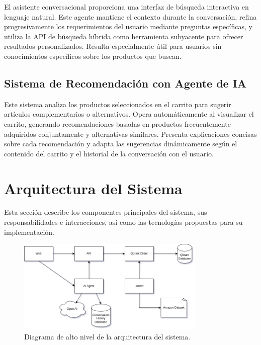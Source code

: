 \documentclass[12pt]{article}
\begin{document}
El asistente conversacional proporciona una interfaz de búsqueda interactiva en lenguaje natural. Este agente mantiene el contexto durante la conversación, refina progresivamente los requerimientos del usuario mediante preguntas específicas, y utiliza la API de búsqueda híbrida como herramienta subyacente para ofrecer resultados personalizados. Resulta especialmente útil para usuarios sin conocimientos específicos sobre los productos que buscan.

\subsection{Sistema de Recomendación con Agente de IA}

Este sistema analiza los productos seleccionados en el carrito para sugerir artículos complementarios o alternativos. Opera automáticamente al visualizar el carrito, generando recomendaciones basadas en productos frecuentemente adquiridos conjuntamente y alternativas similares. Presenta explicaciones concisas sobre cada recomendación y adapta las sugerencias dinámicamente según el contenido del carrito y el historial de la conversación con el usuario.

\newpage

\section{Arquitectura del Sistema}

Esta sección describe los componentes principales del sistema, sus responsabilidades e interacciones, así como las tecnologías propuestas para su implementación.

\vspace{1cm}

\begin{figure}[H]
    \centering
    \includegraphics[width=0.8\textwidth]{architecture.png}
    \caption{Diagrama de alto nivel de la arquitectura del sistema.}
    \label{fig:system_architecture}
\end{figure}
\end{document}
